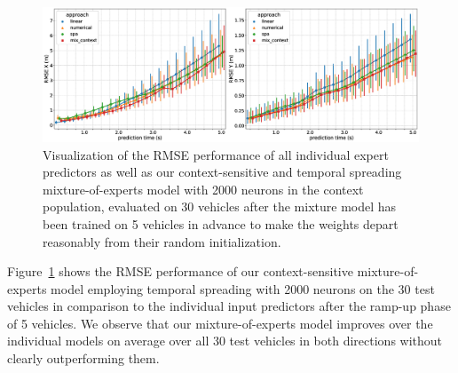 \begin{figure}[t]
    \centering
    \includegraphics[width=0.95\linewidth]{imgs/mix_vs_other_approaches_over_objects.eps}
    \caption{Visualization of the \ac{RMSE} performance of all individual expert predictors as well as our context-sensitive and temporal spreading mixture-of-experts model with \num{2000} neurons in the context population, evaluated on \num{30} vehicles after the mixture model has been trained on \num{5} vehicles in advance to make the weights depart reasonably from their random initialization.}
    \label{fig:mix_vs_other_approaches_over_objects}
\end{figure}

Figure~\ref{fig:mix_vs_other_approaches_over_objects} shows the \ac{RMSE} performance of our context-sensitive mixture-of-experts model employing temporal spreading with \num{2000} neurons on the \num{30} test vehicles in comparison to the individual input predictors after the ramp-up phase of \num{5} vehicles.
We observe that our mixture-of-experts model improves over the individual models on average over all \num{30} test vehicles in both directions without clearly outperforming them.

